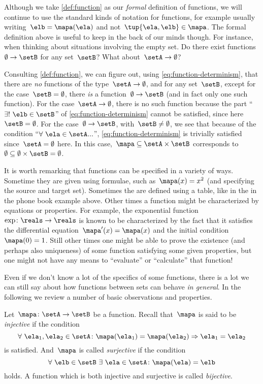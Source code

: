 Although we take \cref{def:function} as our \emph{formal} definition of functions, we will continue to use the standard kinds of notation for functions, for example usually writing~$\elb = \mapa(\ela)$ and not~$\tup{\ela, \elb} \in \mapa$.
The formal definition above is useful to keep in the back of our minds though.
For instance, when thinking about situations involving the empty set.
Do there exist functions~$\emptyset \to \setB$ for any set~$\setB$? What about~$\setA \to \emptyset$?

Consulting \cref{def:function}, we can figure out, using \cref{eq:function-determinism}, that there are \emph{no} functions of the type~$\setA \to \emptyset$, and for any set~$\setB$, except for the case~$\setB = \emptyset$, there \emph{is} a function~$\emptyset \to \setB$ (and in fact only one such function).
For the case~$\setA \to \emptyset$, there is no such function because the part ``$\exists ! \ \elb \in \setB$'' of \cref{eq:function-determinism} cannot be satisfied, since here~$\setB = \emptyset$.
For the case~$\emptyset \to \setB$, with~$\setB \neq \emptyset$, we see that because of the condition ``$\forall \ \ela \in \setA ...$'', \cref{eq:function-determinism} is trivially satisfied since~$\setA = \emptyset$ here.
In this case,~$\mapa \subseteq \setA \times \setB$ corresponds to~$\emptyset \subseteq \emptyset \times \setB = \emptyset$.

It is worth remarking that functions can be specified in a variety of ways.
Sometime they are given using formulae, such as~$\mapa(x)=x^2$ (and specifying the source and target set).
Sometimes the are defined using a table, like in the in the phone book example above.
Other times a function might be characterized by equations or properties.
For example, the exponential function~$\exp \colon \reals \to \reals$ is known to be  characterized by the fact that it satisfies the differential equation~$\mapa'(x) = \mapa(x)$ and the initial condition~$\mapa(0) =1$.
Still other times one might be able to prove the existence (and perhaps also uniqueness) of some function satisfying some given properties, but one might not have any means to ``evaluate'' or ``calculate'' that function!

Even if we don't know a lot of the specifics of some functions, there is a lot we can still say about how functions between sets can behave \emph{in general}. In the following we review a number of basic observations and properties.

Let~$\mapa\colon \setA \to \setB$ be a function.
Recall that~$\mapa$ is said to be \emph{injective} if the condition
\begin{equation}\label{eq:injectivity-cond}
\forall \ \ela_1, \ela_2 \in \setA \colon \mapa(\ela_1) = \mapa(\ela_2)  \Rightarrow \ela_1 = \ela_2
\end{equation}
is satisfied.
And~$\mapa$ is called \emph{surjective} if the condition
\begin{equation}\label{eq:surjectivity-cond}
\forall \ \elb \in \setB \ \exists \ \ela \in \setA \colon \mapa(\ela) = \elb
\end{equation}
holds. A function which is both injective and surjective is called \emph{bijective}.

